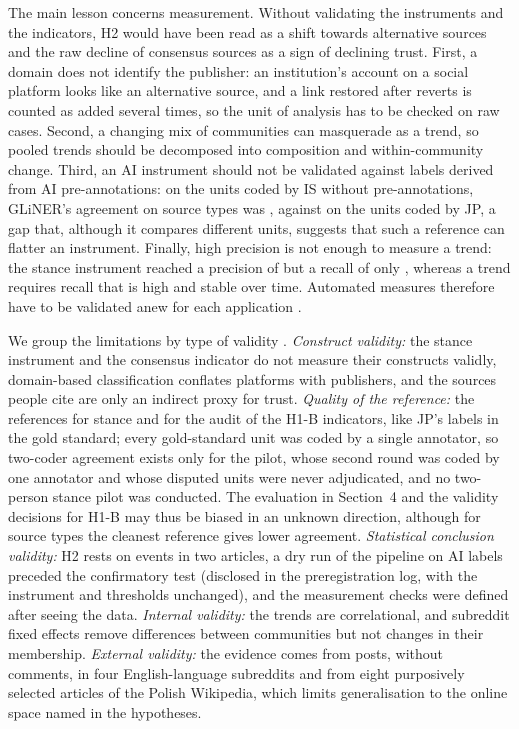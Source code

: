 \documentclass[10pt,a4paper]{article}
\begin{document}
The main lesson concerns measurement. Without validating the instruments and the
indicators, H2 would have been read as a shift towards alternative sources and the raw
decline of consensus sources as a sign of declining trust. First, a domain does not
identify the publisher: an institution's account on a social platform looks like an
alternative source, and a link restored after reverts is counted as added several times,
so the unit of analysis has to be checked on raw cases. Second, a changing mix of
communities can masquerade as a trend, so pooled trends should be decomposed into
composition and within-community change. Third, an AI instrument should not be validated
against labels derived from AI pre-annotations: on the units coded by IS without
pre-annotations, GLiNER's agreement on source types was \resTestGlinerRedditMasiIS,
against \resTestGlinerRedditMasiJP{} on the units coded by JP, a gap that, although it compares different units, suggests that such a
reference can flatter an instrument.
Finally, high precision is not enough to measure a trend: the stance instrument reached a
precision of \resHoneATestChallengesPrecision{} but a recall of only
\resHoneATestChallengesRecall, whereas a trend requires recall that is high and stable over
time. Automated measures therefore have to be validated anew for each application
\cite{grimmer2013}.

We group the limitations by type of validity \cite{shadish2002}. \emph{Construct
validity:} the stance instrument and the consensus indicator do not measure their
constructs validly, domain-based classification conflates platforms with publishers, and
the sources people cite are only an indirect proxy for trust. \emph{Quality of the
reference:} the references for stance and for the audit of the H1-B indicators, like JP's labels in the gold standard; every gold-standard unit was coded by a single annotator, so two-coder
agreement exists only for the pilot, whose second round was coded by one annotator and
whose disputed units were never adjudicated, and no two-person stance pilot was
conducted. The evaluation in Section~4 and the validity decisions for H1-B may thus be
biased in an unknown direction, although for source types the cleanest reference gives
lower agreement. \emph{Statistical conclusion validity:} H2 rests on
\resHtwoAlternativeLinks{} events in two articles, a dry run of the pipeline on AI labels
preceded the confirmatory test (disclosed in the preregistration log, with the instrument
and thresholds unchanged), and the measurement checks were defined after seeing the data.
\emph{Internal validity:} the trends are correlational, and subreddit fixed effects remove
differences between communities but not changes in their membership. \emph{External
validity:} the evidence comes from posts, without comments, in four English-language
subreddits and from eight purposively selected articles of the Polish Wikipedia, which
limits generalisation to the online space named in the hypotheses.
\end{document}
